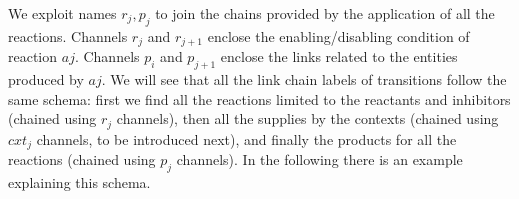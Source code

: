 \noindent
We exploit names $r_j,p_j$ to join the chains provided by the application of all the reactions. 
Channels $r_j$ and $r_{j+1}$ enclose the enabling/disabling condition of reaction $aj$.
Channels $p_i$ and $p_{j+1}$ enclose the links related to the entities produced by $aj$.
We will see that all the link chain labels of transitions follow the same schema: first we find all the reactions limited to the reactants and inhibitors (chained using $r_j$ channels), then all the supplies by the contexts (chained using $cxt_j$ channels, to be introduced next), and finally the products for all the reactions (chained using $p_j$ channels). 
In the following there is an example explaining this schema.

